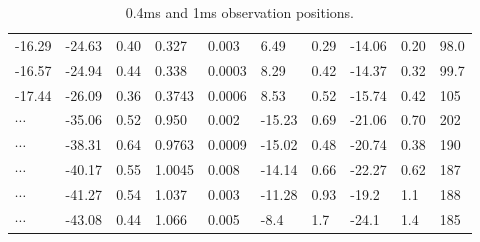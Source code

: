 \documentclass[useAMS,usenatbib]{mn2e}
\begin{document}
\begin{table}
\begin{tabular}{llllllllll}
-16.29   &-24.63                            & 0.40       & 0.327  & 0.003          & 6.49    & 0.29                                     & -14.06    & 0.20       &98.0                                \\

-16.57  &-24.94                            & 0.44      & 0.338 & 0.0003         & 8.29    & 0.42                                     & -14.37    & 0.32      &99.7                                \\

-17.44   &-26.09                            & 0.36      & 0.3743 & 0.0006         & 8.53    & 0.52                                     & -15.74    & 0.42      &105                               
\\ \hline 
 $\cdots$ &       -35.06                           & 0.52                               & 0.950               & 0.002                              & -15.23  & 0.69                                     & -21.06   & 0.70   &202                                   \\

$\cdots$     & -38.31                           & 0.64                               & 0.9763              & 0.0009                             & -15.02  & 0.48                                    & -20.74   & 0.38  &190                                    \\

  $\cdots$  &-40.17                           & 0.55                               & 1.0045              & 0.008                             & -14.14  & 0.66                                    & -22.27   & 0.62  &187                                   \\

  $\cdots$ &-41.27                           & 0.54                               & 1.037              & 0.003                              & -11.28  & 0.93                                     & -19.2   & 1.1   &188                                   \\

$\cdots$ & -43.08                           & 0.44                               & 1.066              & 0.005                              & -8.4   & 1.7                                      & -24.1   & 1.4   &185   \\
 \hline                                 
\end{tabular}
\label{table:apex}
\caption{0.4ms and 1ms observation positions.}
\end{table}
\end{document}
